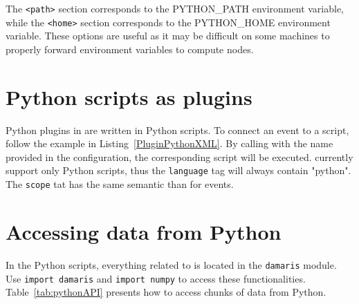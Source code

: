 \noindent\begin{minipage}{\textwidth}
\vspace{0.5cm}

\end{minipage}

The \texttt{<path>} section corresponds to the PYTHON\_PATH environment variable,
while the \texttt{<home>} section corresponds to the PYTHON\_HOME environment variable.
These options are useful as it may be difficult on some machines to properly forward environment
variables to compute nodes.

\section{Python scripts as plugins}

Python plugins in \Damaris{} are written in Python scripts. To connect an event to
a script, follow the example in Listing~\ref{PluginPythonXML}. By calling 
with the name provided in the configuration, the corresponding script will be executed.
\Damaris{} currently support only Python scripts, thus the \texttt{language} tag will always contain
"python". The \texttt{scope} tat has the same semantic than for events.

\noindent\begin{minipage}{\textwidth}
\vspace{0.5cm}

\end{minipage}

\section{Accessing \Damaris{} data from Python}

In the Python scripts, everything related to \Damaris{} is located in the \texttt{damaris} module. 
Use \texttt{import damaris} and \texttt{import numpy} to access these functionalities.
Table~\ref{tab:pythonAPI} presents how to access chunks of data from Python.


